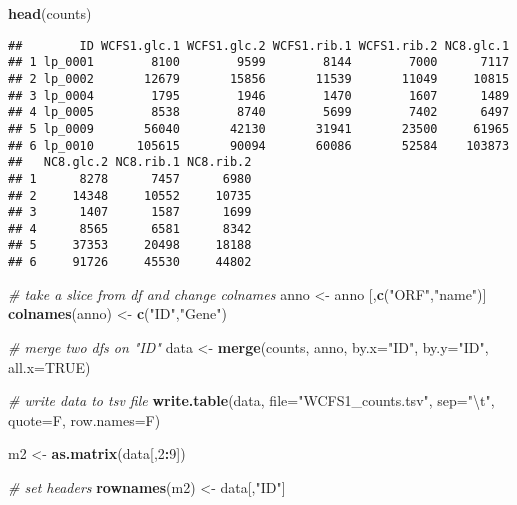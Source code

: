 \documentclass[]{article}
\newenvironment{Shaded}{\begin{snugshade}}{\end{snugshade}}
\newcommand{\KeywordTok}[1]{\textcolor[rgb]{0.13,0.29,0.53}{\textbf{#1}}}
\newcommand{\DataTypeTok}[1]{\textcolor[rgb]{0.13,0.29,0.53}{#1}}
\newcommand{\DecValTok}[1]{\textcolor[rgb]{0.00,0.00,0.81}{#1}}
\newcommand{\CharTok}[1]{\textcolor[rgb]{0.31,0.60,0.02}{#1}}
\newcommand{\StringTok}[1]{\textcolor[rgb]{0.31,0.60,0.02}{#1}}
\newcommand{\CommentTok}[1]{\textcolor[rgb]{0.56,0.35,0.01}{\textit{#1}}}
\newcommand{\OtherTok}[1]{\textcolor[rgb]{0.56,0.35,0.01}{#1}}
\newcommand{\OperatorTok}[1]{\textcolor[rgb]{0.81,0.36,0.00}{\textbf{#1}}}
\newcommand{\NormalTok}[1]{#1}
\begin{document}
\begin{Shaded}
\begin{Highlighting}[]
\KeywordTok{head}\NormalTok{(counts)}
\end{Highlighting}
\end{Shaded}

\begin{verbatim}
##        ID WCFS1.glc.1 WCFS1.glc.2 WCFS1.rib.1 WCFS1.rib.2 NC8.glc.1
## 1 lp_0001        8100        9599        8144        7000      7117
## 2 lp_0002       12679       15856       11539       11049     10815
## 3 lp_0004        1795        1946        1470        1607      1489
## 4 lp_0005        8538        8740        5699        7402      6497
## 5 lp_0009       56040       42130       31941       23500     61965
## 6 lp_0010      105615       90094       60086       52584    103873
##   NC8.glc.2 NC8.rib.1 NC8.rib.2
## 1      8278      7457      6980
## 2     14348     10552     10735
## 3      1407      1587      1699
## 4      8565      6581      8342
## 5     37353     20498     18188
## 6     91726     45530     44802
\end{verbatim}

\begin{Shaded}
\begin{Highlighting}[]
\CommentTok{# take a slice from df and change colnames}
\NormalTok{anno <-}\StringTok{ }\NormalTok{anno [,}\KeywordTok{c}\NormalTok{(}\StringTok{"ORF"}\NormalTok{,}\StringTok{"name"}\NormalTok{)]}
\KeywordTok{colnames}\NormalTok{(anno) <-}\StringTok{ }\KeywordTok{c}\NormalTok{(}\StringTok{"ID"}\NormalTok{,}\StringTok{"Gene"}\NormalTok{)}

\CommentTok{# merge two dfs on "ID"}
\NormalTok{data <-}\StringTok{ }\KeywordTok{merge}\NormalTok{(counts, anno, }\DataTypeTok{by.x=}\StringTok{"ID"}\NormalTok{, }\DataTypeTok{by.y=}\StringTok{"ID"}\NormalTok{, }\DataTypeTok{all.x=}\OtherTok{TRUE}\NormalTok{)}



\CommentTok{# write data to tsv file}
\KeywordTok{write.table}\NormalTok{(data, }\DataTypeTok{file=}\StringTok{"WCFS1_counts.tsv"}\NormalTok{, }\DataTypeTok{sep=}\StringTok{"}\CharTok{\textbackslash{}t}\StringTok{"}\NormalTok{, }\DataTypeTok{quote=}\NormalTok{F, }\DataTypeTok{row.names=}\NormalTok{F)}



\NormalTok{m2 <-}\StringTok{ }\KeywordTok{as.matrix}\NormalTok{(data[,}\DecValTok{2}\OperatorTok{:}\DecValTok{9}\NormalTok{])}

\CommentTok{# set headers }
\KeywordTok{rownames}\NormalTok{(m2) <-}\StringTok{ }\NormalTok{data[,}\StringTok{"ID"}\NormalTok{]}
\end{Highlighting}
\end{Shaded}
\end{document}
